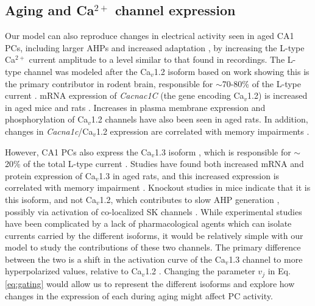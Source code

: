 \documentclass[10pt,letterpaper]{article}
\newcommand{\Ca}{Ca$^{2+}$}
\begin{document}
\subsection*{Aging and {\Ca} channel expression}
Our model can also reproduce changes in electrical activity seen in aged CA1 PCs, including larger AHPs \cite{landfield1984prolonged,gant2009action,power2002age} and increased adaptation \cite{gant2006early,moyer1992nimodipine,tombaugh2005slow}, by increasing the L-type {\Ca} current amplitude 
to a level similar to that found in recordings. The L-type channel was modeled after the Ca$_v$1.2 isoform based on work showing this is the primary contributor in rodent brain, responsible for $\sim$70-80\% of the L-type current \cite{hell1993identification,sinnegger2004isoform}. mRNA expression of \textit{Cacnac1C} (the gene encoding Ca$_v$1.2) is increased in aged mice and rats \cite{herman1998up,zanos2015sex}. Increases in plasma membrane expression \cite{nunez2014surface} and phosphorylation \cite{davare2003increased} of Ca$_v$1.2 channels have also been seen in aged rats. In addition, changes in \textit{Cacna1c}/Ca$_v$1.2 expression are correlated with memory impairments \cite{moosmang2005role,zanos2015sex}.

However, CA1 PCs also express the Ca$_v$1.3 isoform \cite{bowden2001somatic}, which is responsible for $\sim$20\% of the total L-type current \cite{hell1993identification,sinnegger2004isoform}. Studies have found both increased mRNA \cite{herman1998up} and protein \cite{veng2002regionally} expression of Ca$_v$1.3 in aged rats, and this increased expression is correlated with memory impairment \cite{veng2003age}. Knockout studies in mice indicate that it is this isoform, and not Ca$_v$1.2, which contributes to slow AHP generation \cite{gamelli2011deletion}, possibly via activation of co-localized SK channels \cite{bowden2001somatic}. While experimental studies have been complicated by a lack of pharmacological agents which can isolate currents carried by the different isoforms, it would be relatively simple with our model to study the contributions of these two channels. The primary difference between the two is a shift in the activation curve of the Ca$_v$1.3 channel to more hyperpolarized values, relative to Ca$_v$1.2 \cite{xu2001neuronal}. Changing the parameter $v_j$ in Eq. \ref{eq:gating} would allow us to represent the different isoforms and explore how changes in the expression of each during aging might affect PC activity.  
\end{document}
